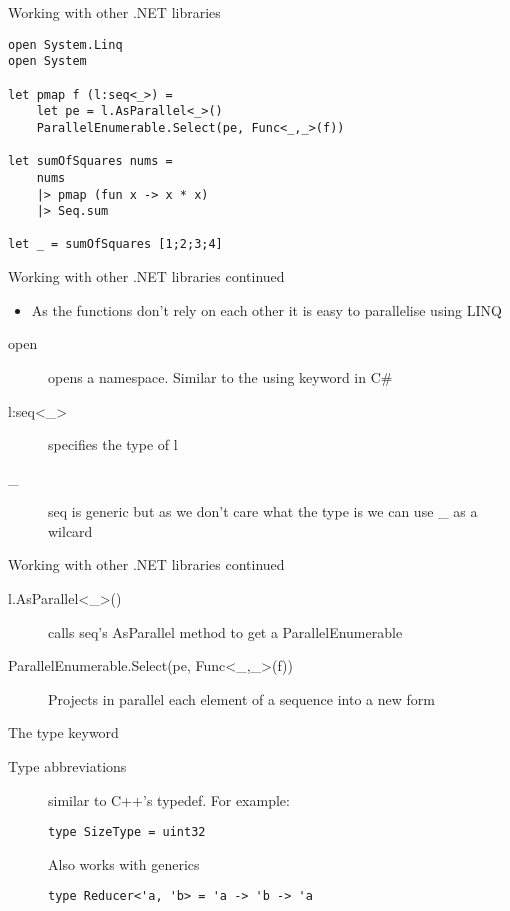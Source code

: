 \documentclass[landscape]{slides}
\begin{document}
\begin{slide}{Working with other .NET libraries}
\begin{verbatim}
open System.Linq
open System

let pmap f (l:seq<_>) =
    let pe = l.AsParallel<_>()
    ParallelEnumerable.Select(pe, Func<_,_>(f))

let sumOfSquares nums =
    nums
    |> pmap (fun x -> x * x) 
    |> Seq.sum

let _ = sumOfSquares [1;2;3;4]
\end{verbatim}
\end{slide}

\begin{slide}{Working with other .NET libraries continued}
\begin{itemize}
\item As the functions don't rely on each other it is easy to parallelise using LINQ
\end{itemize}
\begin{description}
\item[open] opens a namespace. Similar to the using keyword in C\#
\item[l:seq\textless\_\textgreater] specifies the type of l
\item[\_] seq is generic but as we don't care what the type is we can use \_ as a wilcard
\end{description}
\end{slide}

\begin{slide}{Working with other .NET libraries continued}
\begin{description}
\item[l.AsParallel\textless\_\textgreater()] calls seq's AsParallel method to get a ParallelEnumerable
\item[ParallelEnumerable.Select(pe, Func\textless\_,\_\textgreater(f))] Projects in parallel each element of a sequence into a new form
\end{description}
\end{slide}

\begin{slide}{The type keyword}
\begin{description}
\item[Type abbreviations] similar to C++'s typedef. For example:
\begin{verbatim}
type SizeType = uint32
\end{verbatim}
Also works with generics
\begin{verbatim}
type Reducer<'a, 'b> = 'a -> 'b -> 'a
\end{verbatim}
\end{description}
\end{slide}
\end{document}
